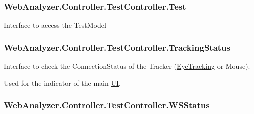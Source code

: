 \subsubsection[{Test}]{ Web\+Analyzer.\+Controller.\+Test\+Controller.\+Test\hspace{0.3cm}{\ttfamily [get]}}\label{class_web_analyzer_1_1_controller_1_1_test_controller_afcf9572f80c31e6d9aca33f96e3aaa4f}


Interface to access the Test\+Model 

\hypertarget{class_web_analyzer_1_1_controller_1_1_test_controller_adc0db19e3cc5958f24dd5fd09ce34d98}{}
\subsubsection[{Tracking\+Status}]{ Web\+Analyzer.\+Controller.\+Test\+Controller.\+Tracking\+Status\hspace{0.3cm}{\ttfamily [get]}}\label{class_web_analyzer_1_1_controller_1_1_test_controller_adc0db19e3cc5958f24dd5fd09ce34d98}


Interface to check the Connection\+Status of the Tracker (\hyperlink{namespace_web_analyzer_1_1_eye_tracking}{Eye\+Tracking} or Mouse). 

Used for the indicator of the main \hyperlink{namespace_web_analyzer_1_1_u_i}{U\+I}. \hypertarget{class_web_analyzer_1_1_controller_1_1_test_controller_a1f3032c3be238b03976be19319a64eeb}{}
\subsubsection[{W\+S\+Status}]{ Web\+Analyzer.\+Controller.\+Test\+Controller.\+W\+S\+Status\hspace{0.3cm}{\ttfamily [get]}}\label{class_web_analyzer_1_1_controller_1_1_test_controller_a1f3032c3be238b03976be19319a64eeb}


